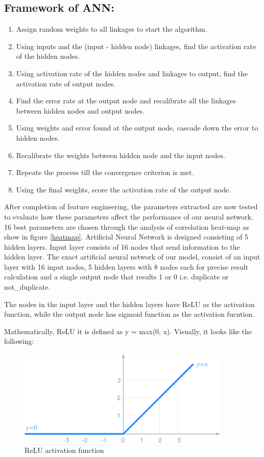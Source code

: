 \subsection{Framework of \acl{ANN}:}
\begin{enumerate}
	\item Assign random weights to all linkages to start the algorithm.
	\item Using inputs and the (input - hidden node) linkages, find the activation rate of the hidden nodes.
	\item Using activation rate of the hidden nodes and linkages to output, find the activation rate of output nodes.
	\item Find the error rate at the output node and recalibrate all the linkages between hidden nodes and output nodes.
	\item Using weights and error found at the output node, cascade down the error to hidden nodes.
	\item Recalibrate the weights between hidden node and the input nodes.
	\item Repeate the process till the convergence criterion is met.
	\item Using the final weights, score the activation rate of the output node.
\end{enumerate}

After completion of feature engineering, the parameters extracted are now tested to evaluate how these parameters affect the performance of our neural network. 16 best parameters are chosen through the analysis of correlation heat-map as show in figure \ref{heatmap}. Artificial Neural Network is designed consisting of 5 hidden layers. Input layer consists of 16 nodes that send information to the hidden layer. The exact artificial neural network of our model, consist of an input layer with 16 input nodes, 5 hidden layers with 8 nodes each for precise result calculation and a single output node that results 1 or 0 i.e. duplicate or not\_duplicate.

The nodes in the input layer and the hidden layers have \ac{ReLU} as the activation function, while the output node has sigmoid function as the activation fucntion.

Mathematically, \ac{ReLU} it is defined as y = max(0, x). Visually, it looks like the following:

\begin{figure}[tbh]
	\begin{center}
		\includegraphics[width = 4in]{images/relu.png}
		\caption{ReLU activation function}
		\label{relu}
	\end{center}
\end{figure}

